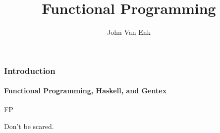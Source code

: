 \documentclass{beamer}
\title{Functional Programming}
\author{John Van Enk}
\institute{Atomic Embedded}
\begin{document}
  \begin{frame}
    \frametitle{Introduction}
    \framesubtitle{Functional Programming, Haskell, and Gentex}
    FP

    Don't be scared.
  \end{frame}
\end{document}
